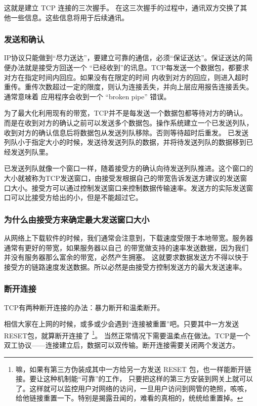 这就是建立 TCP 连接的三次握手。
在这三次握手的过程中，通讯双方交换了其他一些信息。这些信息将用于后续通讯。



\subsubsection{发送和确认}
IP协议只能做到“尽力送达”，要建立可靠的通信，必须“保证送达”。保证送达的简便办法就是接受方回送一个
“已经收到”的讯息。TCP每发送一个数据包，都要求对方在指定时间内回应。如果没有在限定的时间
内收到对方的回应，则进入超时重传。重传次数超过一定的限度，则认为连接丢失，并向上层应用报告连接丢失。通常意味着
应用程序会收到一个 “broken pipe” 错误。


为了最大化利用现有的带宽，TCP并不是每发送一个数据包都等待对方的确认。而是在收到对方的确认之前可以发送多个数据包。操作系统建立一个已发送列队，收到对方的确认信息后将数据包从发送列队移除。否则等待超时后重发。
已发送列队小于指定大小的时候，发送待发送列队的数据，并将待发送列队的数据移到已经发送列队里。


已发送列队就像一个窗口一样，随着接受方的确认向待发送列队推进。这个窗口的大小就被称为TCP发送窗口，由接受发根据自己的带宽告诉发送方建议的发送窗口大小。接受方可以通过控制发送窗口来控制数据传输速率。发送方的实际发送窗口可以比接受方给出的小，但是不能超过它。

\begin{insertnote}
\subsubsection*{为什么由接受方来确定最大发送窗口大小}
从网络上下载软件的时候，我们通常会注意到，下载速度受限于本地带宽。服务器通常有更好的带宽，如果服务器以自己
的带宽做支持的速率发送数据，因为我们并没有服务器那么富余的带宽，必然产生拥塞。
这就要求数据发送方不得以快于接受方的链路速度发送数据。所以必然是由接受方控制发送方的最大发送速率。

\end{insertnote}

\subsubsection{断开连接}

TCP有两种断开连接的办法：暴力断开和温柔断开。

相信大家在上网的时候，或多或少会遇到“连接被重置”吧。只要其中一方发送RESET包，就算断开连接了
\footnote{嘛，如果有第三方伪装成其中一方给另一方发送 RESET 包，也一样能断开链接。要让这种机制能“可靠”的工作， 只要把这样的第三方安装到网关上就可以了。这样就可以监控用户对网络的访问，一旦用户访问到网管的艳照，咳咳，给他链接重置一下。特别是揭露丑闻的，难看的真相的，统统给重置掉。}。
当然正常情况下需要温柔点在做法。TCP是一个双工协议——连接建立后，数据可以双传输。断开连接需要关闭两个发送方。

